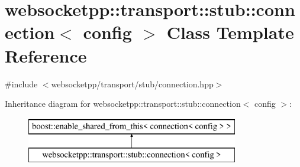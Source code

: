 \hypertarget{classwebsocketpp_1_1transport_1_1stub_1_1connection}{}\section{websocketpp\+:\+:transport\+:\+:stub\+:\+:connection$<$ config $>$ Class Template Reference}
\label{classwebsocketpp_1_1transport_1_1stub_1_1connection}


{\ttfamily \#include $<$websocketpp/transport/stub/connection.\+hpp$>$}

Inheritance diagram for websocketpp\+:\+:transport\+:\+:stub\+:\+:connection$<$ config $>$\+:\begin{figure}[H]
\begin{center}
\leavevmode
\includegraphics[height=2.000000cm]{classwebsocketpp_1_1transport_1_1stub_1_1connection}
\end{center}
\end{figure}
